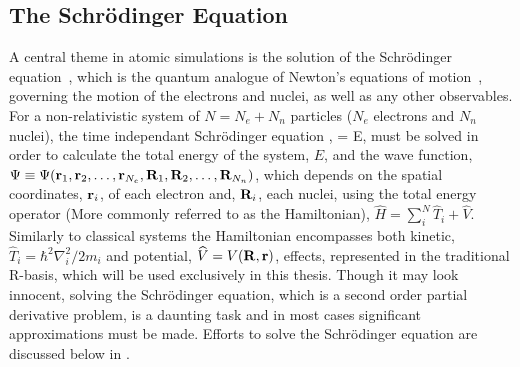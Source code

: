\subsection{The Schr\"odinger Equation}
\label{sec:scrodinger}

A central theme in atomic simulations is the solution of the Schr\"odinger equation~\cite{scrodinger-equation-1926}, which is the quantum analogue of Newton's equations of motion~\cite{newton-latin}, governing the motion of the electrons and nuclei, as well as any other observables.
For a non-relativistic system of $N = N_e + N_n$ particles ($N_e$ electrons and $N_n$ nuclei), the time independant Schr\"odinger equation ,
 \Psi = E\Psi,
\eeq
must be solved in order to calculate the total energy of the system, $E$, and the wave function, $\Psi \equiv \Psi({\mathrm{\mathbf{\bm{r}}}}_1, {\mathrm{\mathbf{\bm{r}}}}_2, \ldots, {\mathrm{\mathbf{\bm{r}}}}_{N_e}, {\mathrm{\mathbf{\bm{R}}}}_1, {\mathrm{\mathbf{\bm{R}}}}_2, \ldots, {\mathrm{\mathbf{\bm{R}}}}_{N_n})$, which depends on the spatial coordinates, ${\mathrm{\mathbf{\bm{r}}}}_i$, of each electron and, ${\mathrm{\mathbf{\bm{R}}}}_i$, each nuclei, using the total energy operator (More commonly referred to as the Hamiltonian), $\widehat{H} = \sum_i^{N}\widehat{T}_i  + \widehat{V}$.
Similarly to classical systems the Hamiltonian encompasses both kinetic, $\widehat{T}_i = \hbar^2\nabla_i^2/2m_i$ and potential, $\widehat{V} = V({\mathrm{\mathbf{\bm{R}}}}, {\mathrm{\mathbf{\bm{r}}}})$, effects, represented in the traditional R-basis, which will be used exclusively in this thesis.
Though it may look innocent, solving the Schr\"odinger equation, which is a second order partial derivative problem, is a daunting task and in most cases significant approximations must be made.
Efforts to solve the Schr\"odinger equation are discussed below in .
